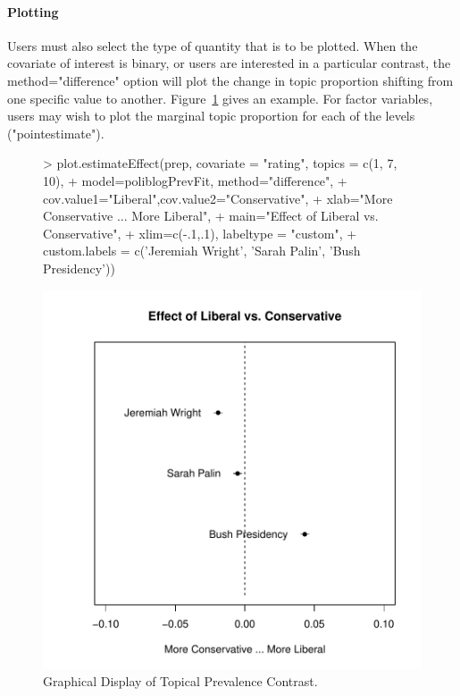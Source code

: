 \documentclass[nojss]{jss}
\begin{document}
\paragraph{Plotting}

Users must also select the type of quantity that is to be plotted. When the covariate of interest is binary, or users are interested in a particular contrast, the method="difference" option will plot the change in topic proportion shifting from one specific value to another. Figure~\ref{fig:difference} gives an example. For factor variables, users may wish to plot the marginal topic proportion for each of the levels ("pointestimate").


\begin{figure}[t!]
\begin{center}
\begin{Schunk}
\begin{Sinput}
> plot.estimateEffect(prep, covariate = "rating", topics = c(1, 7, 10),
+         model=poliblogPrevFit, method="difference",
+         cov.value1="Liberal",cov.value2="Conservative",
+         xlab="More Conservative ... More Liberal",
+         main="Effect of Liberal vs. Conservative",
+         xlim=c(-.1,.1), labeltype = "custom",
+         custom.labels = c('Jeremiah Wright', 'Sarah Palin', 'Bush Presidency'))
\end{Sinput}
\end{Schunk}
\includegraphics{stmVignette-015}
\caption{Graphical Display of Topical Prevalence Contrast.}
\label{fig:difference}
\end{center}
\end{figure}
\end{document}
